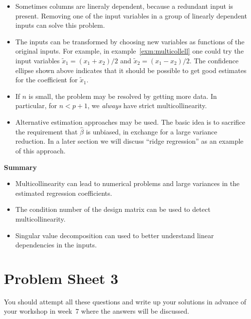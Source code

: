 \documentclass[
  a4paper,
]{article}
\providecommand{\tightlist}{%
  \setlength{\itemsep}{0pt}\setlength{\parskip}{0pt}}
\theoremstyle{definition}
\theoremstyle{definition}
\theoremstyle{definition}
\theoremstyle{definition}
\theoremstyle{remark}
\begin{document}
\begin{itemize}
\item
  Sometimes columns are lineraly dependent, because a redundant input
  is present. Removing one of the input variables in a group
  of linearly dependent inputs can solve this problem.
\item
  The inputs can be transformed by choosing new variables as functions
  of the original inputs. For example, in example~\ref{exm:multicollell}
  one could try the input variables \(\tilde x_1 = (x_1 + x_2) / 2\) and
  \(\tilde x_2 = (x_1 - x_2) / 2\). The confidence ellipse shown above
  indicates that it should be possible to get good estimates for the
  coefficient for \(\tilde x_1\).
\item
  If \(n\) is small, the problem may be resolved by getting more data.
  In particular, for \(n < p+1\), we \emph{always} have strict multicollinearity.
\item
  Alternative estimation approaches may be used. The basic idea is to sacrifice the
  requirement that \(\hat\beta\) is unbiased, in exchange for a large variance
  reduction. In a later section we will discuss ``ridge regression'' as an
  example of this approach.
\end{itemize}

\textbf{Summary}

\begin{itemize}
\tightlist
\item
  Multicollinearity can lead to numerical problems and large variances in the
  estimated regression coefficients.
\item
  The condition number of the design matrix can be used to detect
  multicollinearity.
\item
  Singular value decomposition can used to better understand linear
  dependencies in the inputs.
\end{itemize}

\clearpage

\hypertarget{P03}{%
\section*{Problem Sheet 3}\label{P03}}


You should attempt all these questions and write up your solutions in advance
of your workshop in week~7 where the answers will be discussed.
\end{document}
